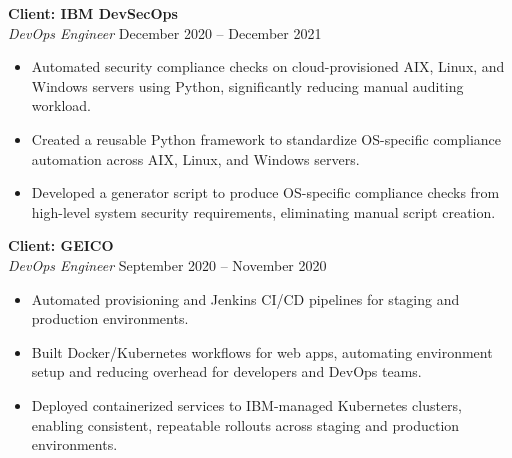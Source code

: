 \documentclass[a4paper]{article}
\begin{document}
\vspace{0.5em}
\noindent
\textbf{Client: IBM DevSecOps} \\
\textit{DevOps Engineer} \hfill December 2020 -- December 2021  
\begin{itemize}[itemsep=1pt, topsep=1pt, parsep=0pt, partopsep=0pt]
    \item Automated security compliance checks on cloud-provisioned AIX, Linux, and Windows servers using Python, significantly reducing manual auditing workload.
    \item Created a reusable Python framework to standardize OS-specific compliance automation across AIX, Linux, and Windows servers.
    \item Developed a generator script to produce OS-specific compliance checks from high-level system security requirements, eliminating manual script creation.
\end{itemize}

\vspace{0.5em}
\noindent
\textbf{Client: GEICO} \\
\textit{DevOps Engineer} \hfill September 2020 -- November 2020
\begin{itemize}[itemsep=1pt, topsep=1pt, parsep=0pt, partopsep=0pt]
    \item Automated provisioning and Jenkins CI/CD pipelines for staging and production environments.
    \item Built Docker/Kubernetes workflows for web apps, automating environment setup and reducing overhead for developers and DevOps teams.
    \item Deployed containerized services to IBM-managed Kubernetes clusters, enabling consistent, repeatable rollouts across staging and production environments.
\end{itemize}
\end{document}
